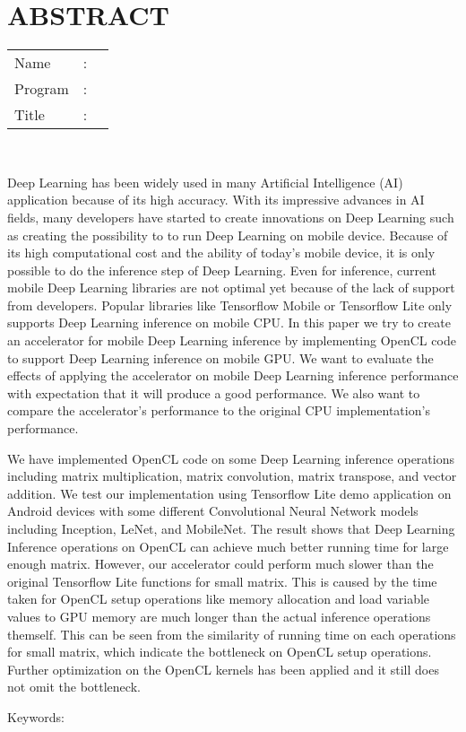 %
%
%

\chapter*{ABSTRACT}

\vspace*{0.2cm}

\noindent \begin{tabular}{l l p{11.0cm}}
	Name&: & \penulis \\
	Program&: & \programInggris \\
	Title&: & \judulInggris \\
\end{tabular} \\ 

\vspace*{0.5cm}

\noindent 
Deep Learning has been widely used in many Artificial Intelligence (AI) application because of its high accuracy. With its impressive advances in AI fields, many developers have started to create innovations on Deep Learning such as creating the possibility to to run Deep Learning on mobile device. Because of its high computational cost and the ability of today's mobile device, it is only possible to do the inference step of Deep Learning. Even for inference, current mobile Deep Learning libraries are not optimal yet because of the lack of support from developers. Popular libraries like Tensorflow Mobile or Tensorflow Lite only supports Deep Learning inference on mobile CPU. In this paper we try to create an accelerator for mobile Deep Learning inference by implementing OpenCL code to support Deep Learning inference on mobile GPU. We want to evaluate the effects of applying the accelerator on mobile Deep Learning inference performance with expectation that it will produce a good performance. We also want to compare the accelerator’s performance to the original CPU implementation’s performance. 

We have implemented OpenCL code on some Deep Learning inference operations including matrix multiplication, matrix convolution, matrix transpose, and vector addition. We test our implementation using Tensorflow Lite demo application on Android devices with some different Convolutional Neural Network models including Inception, LeNet, and MobileNet. The result shows that Deep Learning Inference operations on OpenCL can achieve much better running time for large enough matrix. However, our accelerator could perform much slower than the original Tensorflow Lite functions for small matrix. This is caused by the time taken for OpenCL setup operations like memory allocation and load variable values to GPU memory are much longer than the actual inference operations themself. This can be seen from the similarity of running time on each operations for small matrix, which indicate the bottleneck on OpenCL setup operations. Further optimization on the OpenCL kernels has been applied and it still does not omit the bottleneck.
\\

\vspace*{0.2cm}

\noindent Keywords: \\ 
\noindent {}

\newpage